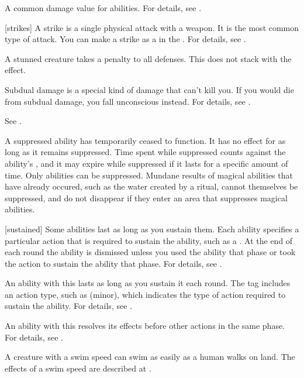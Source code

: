  A common damage value for abilities.
For details, see .

[strikes] A strike is a single physical attack with a weapon.
It is the most common type of attack.
You can make a strike as a  in the .
For details, see .

 A stunned creature takes a  penalty to all defenses.
This does not stack with the  effect.

 Subdual damage is a special kind of damage that can't kill you.
If you would die from subdual damage, you fall unconscious instead.
For details, see .

 See .

 A suppressed ability has temporarily ceased to function.
It has no effect for as long as it remains suppressed.
Time spent while suppressed counts against the ability's , and it may expire while suppressed if it lasts for a specific amount of time.
Only  abilities can be suppressed.
Mundane results of magical abilities that have already occured, such as the water created by a  ritual, cannot themselves be suppressed, and do not disappear if they enter an area that suppresses magical abilities.

[sustained] Some abilities last as long as you sustain them.
Each ability specifies a particular action that is required to sustain the ability, such as a .
At the end of each round the ability is dismissed unless you used the ability that phase or took the action to sustain the ability that phase.
For details, see .

 An ability with this  lasts as long as you sustain it each round.
The tag includes an action type, such as (minor), which indicates the type of action required to sustain the ability.
For details, see .

 An ability with this  resolves its effects before other actions in the same phase.
For details, see .

 A creature with a swim speed can swim as easily as a human walks on land.
The effects of a swim speed are described at .

